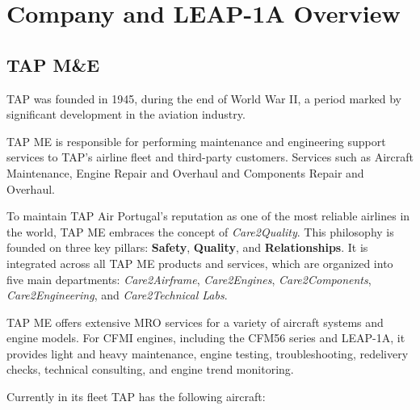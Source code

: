 
%

\chapter{Company and LEAP-1A Overview}
\label{cha:enquadramento}


\section{TAP M\&E}
\label{sec:empresa}

\gls{TAP} was founded in 1945, during the end of World War II, a period marked by significant development in the aviation industry. 

\gls{TAP} \gls{ME} is responsible for performing maintenance and engineering support services to \gls{TAP}'s airline fleet and third-party customers. Services such as Aircraft Maintenance, Engine Repair and Overhaul and Components Repair and Overhaul.

To maintain \gls{TAP} Air Portugal's reputation as one of the most reliable airlines in the world, \gls{TAP} \gls{ME} embraces the concept of \textit{Care2Quality}. This philosophy is founded on three key pillars: \textbf{Safety}, \textbf{Quality}, and \textbf{Relationships}. It is integrated across all \gls{TAP} \gls{ME} products and services, which are organized into five main departments: \textit{Care2Airframe}, \textit{Care2Engines}, \textit{Care2Components}, \textit{Care2Engineering}, and \textit{Care2Technical Labs}.

\gls{TAP} \gls{ME} offers extensive \gls{MRO} services for a variety of aircraft systems and engine models. For \gls{CFMI} engines, including the CFM56 series and \gls{LEAP}-1A, it provides light and heavy maintenance, engine testing, troubleshooting, redelivery checks, technical consulting, and engine trend monitoring.

Currently in its fleet \gls{TAP} has the following aircraft:

